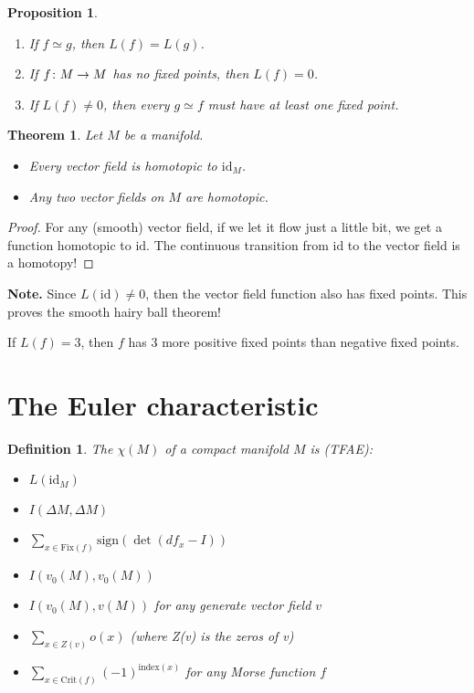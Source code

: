 \documentclass[11pt]{amsbook}
\newenvironment{dateenv}{
	\vspace{1em}
}{
	\vspace{1em}
}
\newcommand{\mydate}[4]{
	\newdate{#1}{#2}{#3}{#4}
	\begin{dateenv}
		\hfill\displaydate{#1}
	\end{dateenv}
}
\theoremstyle{mystyle} %
\newtheorem{thrm}[thm]{Theorem}
\newtheorem{defi}[thm]{Definition}
\newtheorem{propo}[thm]{Proposition}
\numberwithin{thm}{section}
\newcommand{\id}{\text{id}}
\newcommand{\Fix}{\text{Fix}}
\newcommand{\sign}{\text{sign}}
\newcommand{\Crit}{\text{Crit}}
\newcommand{\homotopic}{\simeq}
\begin{document}
\begin{propo}
	\begin{enumerate}
		\item If $f \homotopic g$, then $L(f) = L(g)$.

		\item If $f\colon M \to M$ has no fixed points, then \(L(f) = 0\).

		\item If $L(f) \neq 0$, then every $g \homotopic f$ must have at least one fixed point.
	\end{enumerate}
\end{propo}

\begin{thrm}
	Let $M$ be a manifold.
	\begin{itemize}
		\item Every vector field is homotopic to $\id_M$.
		\item Any two vector fields on $M$ are homotopic.
	\end{itemize}
\end{thrm}
\begin{proof}
	For any (smooth) vector field, if we let it flow just a little bit, we get a function homotopic to $\id$. The continuous transition from $\id$ to the vector field is a homotopy!
\end{proof}

\textbf{Note.}
Since $L(\id) \neq 0$, then the vector field function also has fixed points. This proves the smooth hairy ball theorem!

\begin{rmk}
	If $L(f) = 3$, then $f$ has 3 more positive fixed points than negative fixed points.
\end{rmk}

\mydate{d18}{28}{11}{2016}

\section{The Euler characteristic}

\begin{defi}
	The  $\chi(M)$ of a compact manifold $M$ is (TFAE):
	\begin{itemize}
		\item $L(\id_M)$
		\item $I(\Delta M, \Delta M)$
		\item $\sum_{x \in \Fix(f)} \sign(\det(df_x - I))$
		\item $I(v_0(M), v_0(M))$
		\item $I(v_0(M), v(M))$ for any generate vector field $v$
		\item $\sum_{x \in Z(v)} o(x)$ (where Z(v) is the zeros of v)
		\item $\sum_{x \in \Crit(f)} (-1)^{\text{index}(x)}$ for any Morse function $f$
	\end{itemize}
\end{defi}
\end{document}
